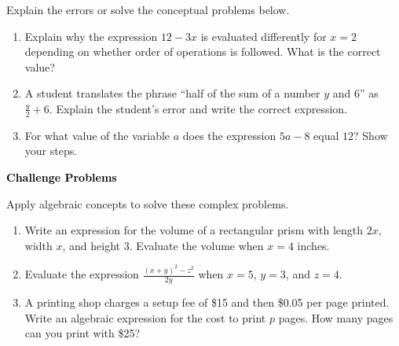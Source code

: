 \documentclass[12pt, letterpaper, fleqn]{article}
\begin{document}
\noindent
Explain the errors or solve the conceptual problems below.

\vspace{3mm}

\begin{enumerate}[itemsep=2.2cm, leftmargin=0.6cm]

\item Explain why the expression $12 - 3x$ is evaluated differently for $x = 2$ depending on whether order of operations is followed. What is the correct value?

\vspace{3cm}

\item A student translates the phrase ``half of the sum of a number $y$ and 6'' as $\frac{y}{2} + 6$. Explain the student's error and write the correct expression.

\vspace{3 cm}

\item For what value of the variable $a$ does the expression $5a - 8$ equal $12$? Show your steps.

\vspace{2cm}

\end{enumerate}

\newpage

\begin{tcolorbox}[colback=black!10]
\large\textcolor{black}{\textbf{Challenge Problems}}
\end{tcolorbox}

\noindent
Apply algebraic concepts to solve these complex problems.

\vspace{3mm}

\begin{enumerate}[itemsep=2.4cm, leftmargin=0.6cm]

\item Write an expression for the volume of a rectangular prism with length $2x$, width $x$, and height $3$. Evaluate the volume when $x = 4$ inches.

\vspace{2.3cm}

\item Evaluate the expression $\frac{(x + y)^2 - z^2}{2y}$ when $x = 5$, $y = 3$, and $z = 4$.

\vspace{2.3cm}

\item A printing shop charges a setup fee of \$15 and then \$0.05 per page printed. Write an algebraic expression for the cost to print $p$ pages. How many pages can you print with \$25?

\vspace{2.5cm}

\end{enumerate}
\end{document}
